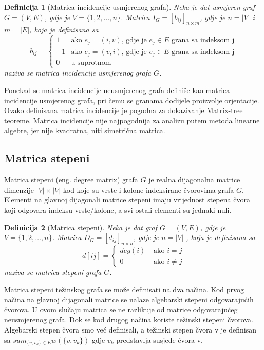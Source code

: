 \documentclass[11pt]{article}
\newtheorem{definition}{Definicija}
\begin{document}
			\begin{definition}[Matrica incidencije usmjerenog grafa] 
			Neka je dat usmjeren graf $G = (V, E)$, gdje je $V = \{1, 2, \dots, n\}$. Matrica $I_G = [b_{ij}]_{n \times m}$, gdje je $n = |V|$ i $m = |E|$, koja je definisana sa
			 \[
				 b_{ij} =
				 \begin{cases}
				 1 & \text{ako } e_j = (i,v) \text{, gdje je } e_j \in E \text{ grana sa indeksom j} \\
				-1 & \text{ako } e_j = (v,i) \text{, gdje je } e_j \in E \text{ grana sa indeksom j} \\
				 0 & \text{u suprotnom}
				 \end{cases}
			 \]
			naziva se matrica incidencije usmjerenog grafa $G$.
			\end{definition}
	
			Ponekad se matrica incidencije neusmjerenog grafa definiše kao matrica incidencije usmjerenog grafa, pri čemu se granama dodijele proizvolje orjentacije. 
			Ovako definisana matrica incidencije je pogodna za dokazivanje Matrix-tree teoreme.
			Matrica incidencije nije najpogodnija za analizu putem metoda linearne algebre, jer nije kvadratna, niti simetrična matrica.
	
		\subsection{Matrica stepeni}
		Matrica stepeni (eng. degree matrix) grafa $G$ je realna dijagonalna matrice dimenzije $|V| \times |V|$ kod koje su vrste i kolone indeksirane čvorovima grafa $G$.
		Elementi na glavnoj dijagonali matrice stepeni imaju vrijednost stepena čvora koji odgovara indeksu vrste/kolone, a svi ostali elementi su jednaki nuli. 
	
			\begin{definition}[Matrica stepeni] 
			Neka je dat graf $G = (V, E)$, gdje je $V = \{1, 2, \dots, n\}$. Matrica $D_G = [d_{ij}]_{n \times n}$, gdje je $n = |V|$ , koja je definisana sa
			\[
				d[ij] = 
				 \begin{cases}
				 deg(i) & \text{ ako } i = j  \\ 
				 0  & \text{ ako } i \neq j 
				 \end{cases}
			\]
			naziva se matrica stepeni grafa $G$.
			\end{definition}

			Matrica stepeni težinskog grafa se može definisati na dva načina. Kod prvog načina na glavnoj dijagonali matrice se nalaze algebarski stepeni odgovarajućih čvorova. U ovom slučaju matrica se ne razlikuje
			od matrice odgovarajućeg neusmjerenog grafa. Dok se kod drugog načina koriste težinski stepeni čvorova.
			Algebarski stepen čvora smo već definisali, a težinski stepen čvora v je definisan sa $sum_{\{v,v_k\} \in E} w(\{v,v_k\})$ gdje $v_k$ predstavlja susjede čvora v.  
		
\end{document}
